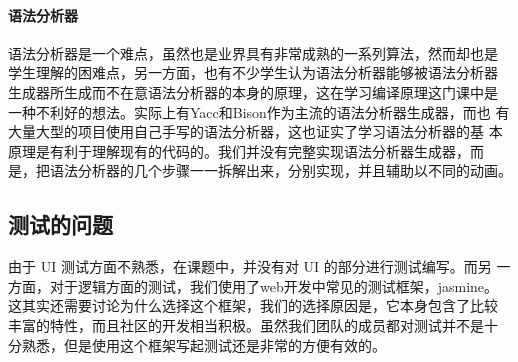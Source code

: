 \paragraph{语法分析器}
语法分析器是一个难点，虽然也是业界具有非常成熟的一系列算法，然而却也是
学生理解的困难点，另一方面，也有不少学生认为语法分析器能够被语法分析器
生成器所生成而不在意语法分析器的本身的原理，这在学习编译原理这门课中是
一种不利好的想法。实际上有Yacc和Bison作为主流的语法分析器生成器，而也
有大量大型的项目使用自己手写的语法分析器，这也证实了学习语法分析器的基
本原理是有利于理解现有的代码的。我们并没有完整实现语法分析器生成器，而
是，把语法分析器的几个步骤一一拆解出来，分别实现，并且辅助以不同的动画。

\subsection{测试的问题}

由于 UI 测试方面不熟悉，在课题中，并没有对 UI 的部分进行测试编写。而另
一方面，对于逻辑方面的测试，我们使用了web开发中常见的测试框架，jasmine。
这其实还需要讨论为什么选择这个框架，我们的选择原因是，它本身包含了比较
丰富的特性，而且社区的开发相当积极。虽然我们团队的成员都对测试并不是十
分熟悉，但是使用这个框架写起测试还是非常的方便有效的。
